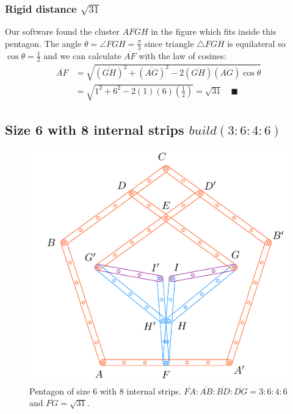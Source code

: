 \documentclass[11pt]{article}
\begin{document}
\subsubsection{Rigid distance $\sqrt{31}$}

Our software found the cluster $AFGH$ in the figure which fits inside this pentagon. The angle $\theta = \angle{FGH} = \frac{\pi}3$ since triangle $\triangle{FGH}$ is equilateral so $\cos\theta = \frac{1}2$ and we can calculate $\overline{AF}$ with the law of cosines:
\begin{align}
\overline{AF} &= \sqrt{(\overline{GH})^2 + (\overline{AG})^2 
 - 2(\overline{GH})(\overline{AG})\cos\theta} \nonumber\\
 &= \sqrt{1^2 + 6^2 - 2(1)(6)\left(\frac{1}2\right)} = \sqrt{31} \quad \blacksquare
\end{align}


\subsection{Size 6 with 8 internal strips $build(3:6:4:6)$}

\begin{figure}[H]
\centering
\includegraphics[scale=1.2]{6/penta6-8b}
\caption{Pentagon of size 6 with 8 internal strips. $\overline{FA} : \overline{AB} : \overline{BD} : \overline{DG} = 3:6:4:6$ and $\overline{FG} = \sqrt{31}$.}
\label{fig:penta6-8b}
\end{figure}
\end{document}
